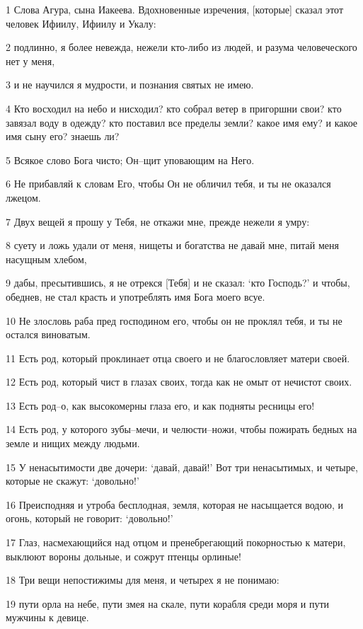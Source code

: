 \par 1 Слова Агура, сына Иакеева. Вдохновенные изречения, [которые] сказал этот человек Ифиилу, Ифиилу и Укалу:
\par 2 подлинно, я более невежда, нежели кто-либо из людей, и разума человеческого нет у меня,
\par 3 и не научился я мудрости, и познания святых не имею.
\par 4 Кто восходил на небо и нисходил? кто собрал ветер в пригоршни свои? кто завязал воду в одежду? кто поставил все пределы земли? какое имя ему? и какое имя сыну его? знаешь ли?
\par 5 Всякое слово Бога чисто; Он--щит уповающим на Него.
\par 6 Не прибавляй к словам Его, чтобы Он не обличил тебя, и ты не оказался лжецом.
\par 7 Двух вещей я прошу у Тебя, не откажи мне, прежде нежели я умру:
\par 8 суету и ложь удали от меня, нищеты и богатства не давай мне, питай меня насущным хлебом,
\par 9 дабы, пресытившись, я не отрекся [Тебя] и не сказал: `кто Господь?' и чтобы, обеднев, не стал красть и употреблять имя Бога моего всуе.
\par 10 Не злословь раба пред господином его, чтобы он не проклял тебя, и ты не остался виноватым.
\par 11 Есть род, который проклинает отца своего и не благословляет матери своей.
\par 12 Есть род, который чист в глазах своих, тогда как не омыт от нечистот своих.
\par 13 Есть род--о, как высокомерны глаза его, и как подняты ресницы его!
\par 14 Есть род, у которого зубы--мечи, и челюсти--ножи, чтобы пожирать бедных на земле и нищих между людьми.
\par 15 У ненасытимости две дочери: `давай, давай!' Вот три ненасытимых, и четыре, которые не скажут: `довольно!'
\par 16 Преисподняя и утроба бесплодная, земля, которая не насыщается водою, и огонь, который не говорит: `довольно!'
\par 17 Глаз, насмехающийся над отцом и пренебрегающий покорностью к матери, выклюют вороны дольные, и сожрут птенцы орлиные!
\par 18 Три вещи непостижимы для меня, и четырех я не понимаю:
\par 19 пути орла на небе, пути змея на скале, пути корабля среди моря и пути мужчины к девице.
